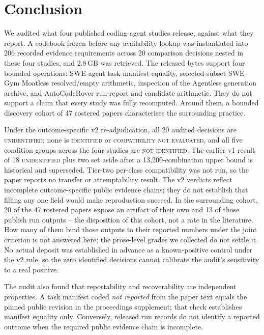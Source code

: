 \section{Conclusion}
\label{sec:conclusion}

We audited what four published coding-agent studies release, against what they report. A
codebook frozen before any availability lookup was instantiated into 206 recorded evidence
requirements across 20 comparison decisions nested in those four studies, and 2.8\,GB was
retrieved. The released bytes support four bounded operations: SWE-agent task-manifest
equality, selected-subset SWE-Gym Moatless resolved/empty arithmetic, inspection of the
Agentless generation archive, and AutoCodeRover run-report and candidate arithmetic.
They do not support a claim that every study was fully recomputed. Around them, a bounded
discovery cohort of 47 rostered papers characterises the surrounding practice.

Under the outcome-specific v2 re-adjudication, all 20 audited decisions are
\textsc{unidentified}; none is \textsc{identified} or \textsc{compatibility not evaluated},
and all five condition groups across the four studies are \textsc{not identified}. The earlier
v1 result of 18 \textsc{unidentified} plus two set aside after a 13{,}200-combination upper
bound is historical and superseded. Tier-two per-class compatibility was not run, so the paper
reports no transfer or attemptability result. The v2 verdicts reflect incomplete
outcome-specific public evidence chains; they do not establish that filling any one field
would make reproduction succeed. In the surrounding cohort, 20 of the 47 rostered papers
expose an artifact of their own and 13 of those publish run outputs -- the disposition of this
cohort, not a rate in the literature.
How many of them bind those outputs to their reported numbers under the joint criterion is
not answered here; the prose-level grades we collected do not settle it.
No actual deposit was established in advance as a known-positive control under the v2 rule,
so the zero identified decisions cannot calibrate the audit's sensitivity to a real positive.

The audit also found that reportability and recoverability are independent properties. A
task manifest coded \emph{not reported} from the paper text equals the pinned public revision in the
proceedings supplement; that check establishes manifest equality only. Conversely, released
run records do not identify a reported outcome when the required public evidence chain is
incomplete.

